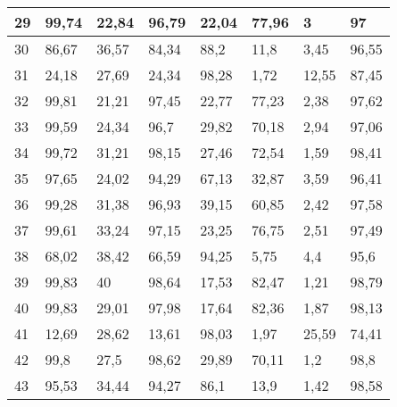\begin{longtable}[c]{|l|l|l|l|l|l|l|l|}
29              & 99,74        & 22,84        & 96,79       & 22,04         & 77,96         & 3             & 97            \\ \hline
30              & 86,67        & 36,57        & 84,34       & 88,2          & 11,8          & 3,45          & 96,55         \\ \hline
31              & 24,18        & 27,69        & 24,34       & 98,28         & 1,72          & 12,55         & 87,45         \\ \hline
32              & 99,81        & 21,21        & 97,45       & 22,77         & 77,23         & 2,38          & 97,62         \\ \hline
33              & 99,59        & 24,34        & 96,7        & 29,82         & 70,18         & 2,94          & 97,06         \\ \hline
34              & 99,72        & 31,21        & 98,15       & 27,46         & 72,54         & 1,59          & 98,41         \\ \hline
35              & 97,65        & 24,02        & 94,29       & 67,13         & 32,87         & 3,59          & 96,41         \\ \hline
36              & 99,28        & 31,38        & 96,93       & 39,15         & 60,85         & 2,42          & 97,58         \\ \hline
37              & 99,61        & 33,24        & 97,15       & 23,25         & 76,75         & 2,51          & 97,49         \\ \hline
38              & 68,02        & 38,42        & 66,59       & 94,25         & 5,75          & 4,4           & 95,6          \\ \hline
39              & 99,83        & 40           & 98,64       & 17,53         & 82,47         & 1,21          & 98,79         \\ \hline
40              & 99,83        & 29,01        & 97,98       & 17,64         & 82,36         & 1,87          & 98,13         \\ \hline
41              & 12,69        & 28,62        & 13,61       & 98,03         & 1,97          & 25,59         & 74,41         \\ \hline
42              & 99,8         & 27,5         & 98,62       & 29,89         & 70,11         & 1,2           & 98,8          \\ \hline
43              & 95,53        & 34,44        & 94,27       & 86,1          & 13,9          & 1,42          & 98,58         \\ \hline

\end{longtable}
